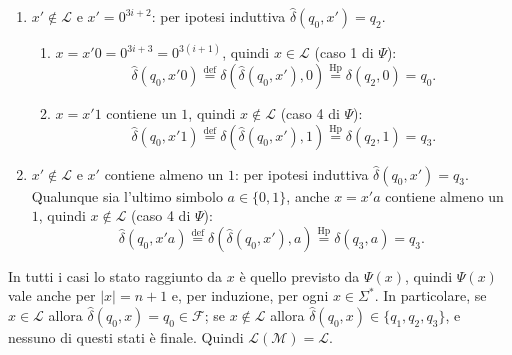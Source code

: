 \documentclass[a4paper, 11pt, oneside]{book}
\theoremstyle{formale}
\begin{document}
\begin{enumerate}
\begin{enumerate}[label=\arabic{enumi}\alph*.]
                    $\Psi$):
                    \begin{equation*}
                        \hat{\delta}(q_0, x'1)
                        \overset{\text{def}}{=} \delta(\hat{\delta}(q_0, x'), 1)
                        \overset{\text{Hp}}{=} \delta(q_1, 1) = q_3.
                    \end{equation*}
            \end{enumerate}
        \item $x' \notin \mathcal{L}$ e $x' = 0^{3i+2}$: per ipotesi induttiva
            $\hat{\delta}(q_0, x') = q_2$.
            \begin{enumerate}[label=\arabic{enumi}\alph*.]
                \item $x = x'0 = 0^{3i+3} = 0^{3(i+1)}$, quindi $x \in \mathcal{L}$ (caso 1
                    di $\Psi$):
                    \begin{equation*}
                        \hat{\delta}(q_0, x'0)
                        \overset{\text{def}}{=} \delta(\hat{\delta}(q_0, x'), 0)
                        \overset{\text{Hp}}{=} \delta(q_2, 0) = q_0.
                    \end{equation*}
                \item $x = x'1$ contiene un $1$, quindi $x \notin \mathcal{L}$ (caso 4 di
                    $\Psi$):
                    \begin{equation*}
                        \hat{\delta}(q_0, x'1)
                        \overset{\text{def}}{=} \delta(\hat{\delta}(q_0, x'), 1)
                        \overset{\text{Hp}}{=} \delta(q_2, 1) = q_3.
                    \end{equation*}
            \end{enumerate}
        \item $x' \notin \mathcal{L}$ e $x'$ contiene almeno un $1$: per ipotesi induttiva
            $\hat{\delta}(q_0, x') = q_3$. Qualunque sia l'ultimo simbolo $a \in \{0, 1\}$,
            anche $x = x'a$ contiene almeno un $1$, quindi $x \notin \mathcal{L}$ (caso 4 di
            $\Psi$):
            \begin{equation*}
                \hat{\delta}(q_0, x'a)
                \overset{\text{def}}{=} \delta(\hat{\delta}(q_0, x'), a)
                \overset{\text{Hp}}{=} \delta(q_3, a) = q_3.
            \end{equation*}
    \end{enumerate}
    In tutti i casi lo stato raggiunto da $x$ \`e quello previsto da $\Psi(x)$, quindi
    $\Psi(x)$ vale anche per $|x| = n + 1$ e, per induzione, per ogni $x \in \Sigma^*$. In
    particolare, se $x \in \mathcal{L}$ allora $\hat{\delta}(q_0, x) = q_0 \in \mathcal{F}$;
    se $x \notin \mathcal{L}$ allora $\hat{\delta}(q_0, x) \in \{q_1, q_2, q_3\}$, e nessuno
    di questi stati \`e finale. Quindi $\mathcal{L}(\mathcal{M}) = \mathcal{L}$.
\end{document}
